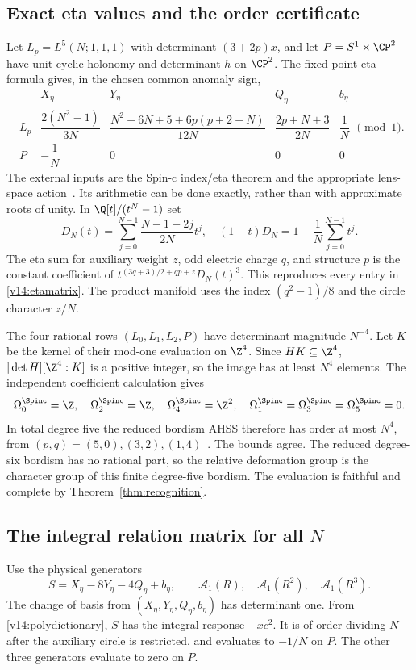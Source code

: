 \subsection{Exact eta values and the order certificate}
Let $L_p=L^5(N;1,1,1)$ with determinant $(3+2p)x$, and let $P=S^1\times\CP^2$ have unit cyclic holonomy and determinant $h$ on $\CP^2$. The fixed-point eta formula gives, in the chosen common anomaly sign,
\begin{equation}\label{v14:etamatrix}
\begin{array}{c|cccc}
 &X_\eta&Y_\eta&Q_\eta&b_\eta\\\hline
L_p&\dfrac{2(N^2-1)}{3N}&\dfrac{N^2-6N+5+6p(p+2-N)}{12N}
 &\dfrac{2p+N+3}{2N}&\dfrac1N\\[5pt]
P&-\dfrac1N&0&0&0
\end{array}\pmod1.
\end{equation}
The external inputs are the Spin-c index/eta theorem and the appropriate lens-space action~\cite{BahriGilkey,Hsieh}. Its arithmetic can be done exactly, rather than with approximate roots of unity. In $\Q[t]/(t^N-1)$ set
\begin{equation}\label{v14:etaD}
D_N(t)=\sum_{j=0}^{N-1}\frac{N-1-2j}{2N}t^j,
\quad
(1-t)D_N=1-\frac1N\sum_{j=0}^{N-1}t^j.
\end{equation}
The eta sum for auxiliary weight $z$, odd electric charge $q$, and structure $p$ is the constant coefficient of $t^{(3q+3)/2+qp+z}D_N(t)^3$. This reproduces every entry in \eqref{v14:etamatrix}. The product manifold uses the index $(q^2-1)/8$ and the circle character $z/N$.

The four rational rows $(L_0,L_1,L_2,P)$ have determinant magnitude $N^{-4}$. Let $K$ be the kernel of their mod-one evaluation on $\Z^4$. Since $H K\subseteq\Z^4$, $|\det H|[\Z^4:K]$ is a positive integer, so the image has at least $N^4$ elements. The independent coefficient calculation gives
\[
\Omega_0^{\Spinc}=\Z,\quad\Omega_2^{\Spinc}=\Z,
\quad\Omega_4^{\Spinc}=\Z^2,\quad\Omega_1^{\Spinc}=\Omega_3^{\Spinc}=\Omega_5^{\Spinc}=0.
\]
In total degree five the reduced bordism AHSS therefore has order at most $N^4$, from $(p,q)=(5,0),(3,2),(1,4)$~\cite{FreedHopkins}. The bounds agree. The reduced degree-six bordism has no rational part, so the relative deformation group is the character group of this finite degree-five bordism. The evaluation is faithful and complete by Theorem~\ref{thm:recognition}.

\subsection{The integral relation matrix for all $N$}
Use the physical generators
\[
S=X_\eta-8Y_\eta-4Q_\eta+b_\eta,
\qquad\mathcal A_1(R),\quad\mathcal A_1(R^2),\quad\mathcal A_1(R^3).
\]
The change of basis from $(X_\eta,Y_\eta,Q_\eta,b_\eta)$ has determinant one. From \eqref{v14:polydictionary}, $S$ has the integral response $-xc^2$. It is of order dividing $N$ after the auxiliary circle is restricted, and evaluates to $-1/N$ on $P$. The other three generators evaluate to zero on $P$.

